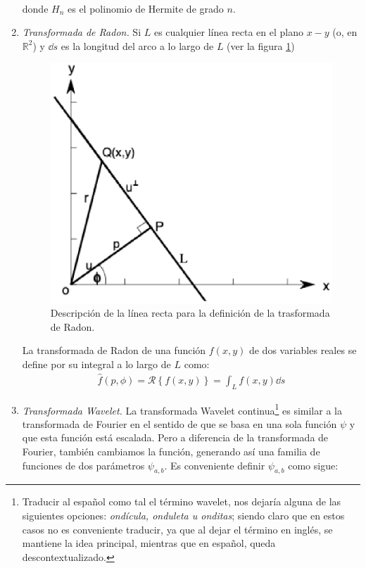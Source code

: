 \begin{enumerate}
\begin{align}
\label{eq:ecuacion_17_2_1}
\end{align}
donde $H_{n}$ es el polinomio de Hermite de grado $n$.
\item \emph{Transformada de Radon.}
Si $L$ es cualquier línea recta en el plano $x-y$ (o, en $\mathbb{R}^{2}$) y $\dd{s}$ es la longitud del arco a lo largo de $L$ (ver la figura \ref{eq:figura_Radon})
\begin{figure}[H]
    \centering
    \includegraphics[scale=0.7]{Imagenes/Transformada_Radon_01.eps}
    \caption{Descripción de la línea recta para la definición de la trasformada de Radon.}
    \label{eq:figura_Radon}
\end{figure}
La transformada de Radon de una función $f (x, y)$ de dos variables reales se define por su integral a lo largo de $L$ como:
\begin{align}
\hat{f} (p, \phi) = \mathscr{R} \left\{ f(x, y) \right\} = \int_{L} f(x, y) \dd{s}
\label{eq:ecuacion_18_2_1}
\end{align}
\item \emph{Transformada Wavelet.}
La transformada Wavelet continua\footnote{Traducir al español como tal el término wavelet, nos dejaría alguna de las siguientes opciones: \emph{ondícula, onduleta u onditas}; siendo claro que en estos casos no es conveniente traducir, ya que al dejar el término en inglés, se mantiene la idea principal, mientras que en español, queda descontextualizado.} es similar a la transformada de Fourier en el sentido de que se basa en una sola función $\psi$ y que esta función está escalada. Pero a diferencia de la transformada de Fourier, también cambiamos la función, generando así una familia de funciones de dos parámetros $\psi_{a, b}$. Es conveniente definir $\psi_{a, b}$ como sigue:

\end{enumerate}

